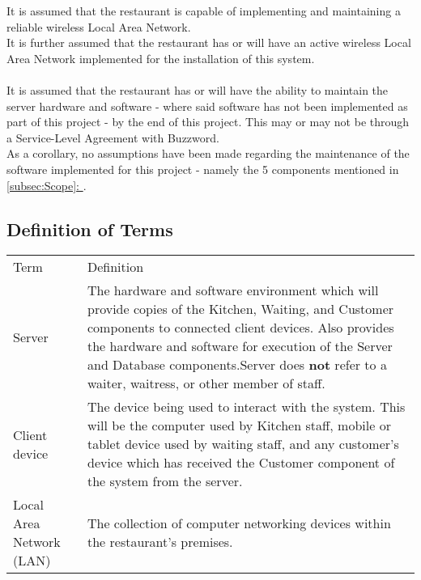 \documentclass[11pt, a4paper]{article}
\newcommand{\gref}[1]{\hyperref[#1]{\autoref*{#1}: \nameref{#1}}} %
\begin{document}
It is assumed that the restaurant is capable of implementing and maintaining a reliable wireless Local Area Network.\\
It is further assumed that the restaurant has or will have an active wireless Local Area Network implemented for the installation of this system.\\
\\
It is assumed that the restaurant has or will have the ability to maintain the server hardware and software - where said software has not been implemented as part of this project - by the end of this project. This may or may not be through a Service-Level Agreement with Buzzword.\\
As a corollary, no assumptions have been made regarding the maintenance of the software implemented for this project - namely the 5 components mentioned in \gref{subsec:Scope}.

\subsection{Definition of Terms} \label{subsec:Definitions}
\vspace{1cm}

\begin{tabulary}{1.2\textwidth}{l L}
Term & Definition \\

Server & The hardware and software environment which will provide copies of the Kitchen, Waiting, and Customer components to connected client devices. Also provides the hardware and software for execution of the Server and Database components.\newline Server does \textbf{not} refer to a waiter, waitress, or other member of staff. \\ \midrule
Client device & The device being used to interact with the system. This will be the computer used by Kitchen staff, mobile or tablet device used by waiting staff, and any customer's device which has received the Customer component of the system from the server.\\ \midrule
Local Area Network (LAN) & The collection of computer networking devices within the restaurant's premises.
\end{tabulary}
\end{document}
